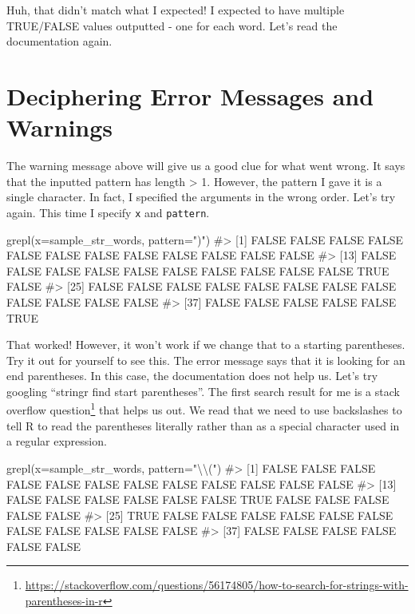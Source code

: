 \documentclass[
  letterpaper,
]{krantz}
\makeatletter
\newenvironment{Shaded}{\begin{snugshade}}{\end{snugshade}}
\newcommand{\AttributeTok}[1]{\textcolor[rgb]{0.40,0.45,0.13}{#1}}
\newcommand{\CommentTok}[1]{\textcolor[rgb]{0.37,0.37,0.37}{#1}}
\newcommand{\FunctionTok}[1]{\textcolor[rgb]{0.28,0.35,0.67}{#1}}
\newcommand{\NormalTok}[1]{\textcolor[rgb]{0.00,0.23,0.31}{#1}}
\newcommand{\SpecialCharTok}[1]{\textcolor[rgb]{0.37,0.37,0.37}{#1}}
\newcommand{\StringTok}[1]{\textcolor[rgb]{0.13,0.47,0.30}{#1}}
\renewcommand{\href}[2]{#2\footnote{\url{#1}}}
\newenvironment{kframe}{%
\medskip{}
\setlength{\fboxsep}{.8em}
 \def\at@end@of@kframe{}%
 \ifinner\ifhmode%
  \def\at@end@of@kframe{\end{minipage}}%
  \begin{minipage}{\columnwidth}%
 \fi\fi%
 \def\FrameCommand##1{\hskip\@totalleftmargin \hskip-\fboxsep
 \colorbox{shadecolor}{##1}\hskip-\fboxsep
     \hskip-\linewidth \hskip-\@totalleftmargin \hskip\columnwidth}%
 \MakeFramed {\advance\hsize-\width
   \@totalleftmargin\z@ \linewidth\hsize
   \@setminipage}}%
 {\par\unskip\endMakeFramed%
 \at@end@of@kframe}
\renewenvironment{Shaded}{\begin{kframe}}{\end{kframe}}
\makeatother
\begin{document}
Huh, that didn't match what I expected! I expected to have multiple
TRUE/FALSE values outputted - one for each word. Let's read the
documentation again.

\hypertarget{deciphering-error-messages-and-warnings}{%
\section{Deciphering Error Messages and
Warnings}\label{deciphering-error-messages-and-warnings}}

The warning message above will give us a good clue for what went wrong.
It says that the inputted pattern has length \textgreater{} 1. However,
the pattern I gave it is a single character. In fact, I specified the
arguments in the wrong order. Let's try again. This time I specify
\texttt{x} and \texttt{pattern}.

\begin{Shaded}
\begin{Highlighting}[]
\FunctionTok{grepl}\NormalTok{(}\AttributeTok{x=}\NormalTok{sample\_str\_words, }\AttributeTok{pattern=}\StringTok{")"}\NormalTok{)}
\CommentTok{\#\textgreater{}  [1] FALSE FALSE FALSE FALSE FALSE FALSE FALSE FALSE FALSE FALSE FALSE FALSE}
\CommentTok{\#\textgreater{} [13] FALSE FALSE FALSE FALSE FALSE FALSE FALSE FALSE FALSE FALSE  TRUE FALSE}
\CommentTok{\#\textgreater{} [25] FALSE FALSE FALSE FALSE FALSE FALSE FALSE FALSE FALSE FALSE FALSE FALSE}
\CommentTok{\#\textgreater{} [37] FALSE FALSE FALSE FALSE FALSE  TRUE}
\end{Highlighting}
\end{Shaded}

That worked! However, it won't work if we change that to a starting
parentheses. Try it out for yourself to see this. The error message says
that it is looking for an end parentheses. In this case, the
documentation does not help us. Let's try googling ``stringr find start
parentheses''. The first search result for me is a
\href{https://stackoverflow.com/questions/56174805/how-to-search-for-strings-with-parentheses-in-r}{stack
overflow question} that helps us out. We read that we need to use
backslashes to tell R to read the parentheses literally rather than as a
special character used in a regular expression.

\begin{Shaded}
\begin{Highlighting}[]
\FunctionTok{grepl}\NormalTok{(}\AttributeTok{x=}\NormalTok{sample\_str\_words, }\AttributeTok{pattern=}\StringTok{"}\SpecialCharTok{\textbackslash{}\textbackslash{}}\StringTok{("}\NormalTok{)}
\CommentTok{\#\textgreater{}  [1] FALSE FALSE FALSE FALSE FALSE FALSE FALSE FALSE FALSE FALSE FALSE FALSE}
\CommentTok{\#\textgreater{} [13] FALSE FALSE FALSE FALSE FALSE FALSE  TRUE FALSE FALSE FALSE FALSE FALSE}
\CommentTok{\#\textgreater{} [25]  TRUE FALSE FALSE FALSE FALSE FALSE FALSE FALSE FALSE FALSE FALSE FALSE}
\CommentTok{\#\textgreater{} [37] FALSE FALSE FALSE FALSE FALSE FALSE}
\end{Highlighting}
\end{Shaded}
\end{document}
